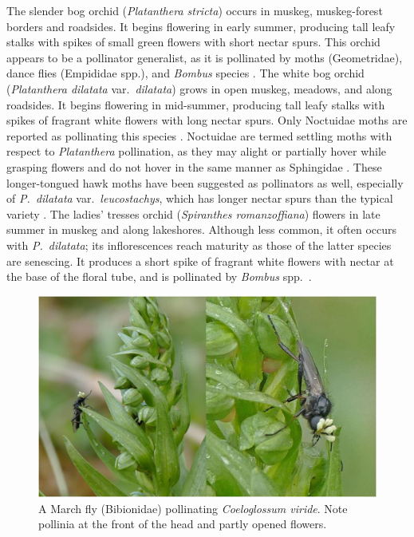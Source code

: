 \begin{multicols}{2}
The slender bog orchid (\emph{Platanthera stricta}) occurs in muskeg,
muskeg-forest borders and roadsides. It begins flowering in early
summer, producing tall leafy stalks with spikes of small green flowers
with short nectar spurs. This orchid appears to be a pollinator
generalist, as it is pollinated by moths (Geometridae), dance flies
(Empididae spp.), and \emph{Bombus} species \citep{Pattetal1989}.
The white bog orchid (\emph{Platanthera dilatata} var.\ \emph{dilatata})
grows in open muskeg, meadows, and along roadsides. It begins flowering
in mid-summer, producing tall leafy stalks with spikes of fragrant white
flowers with long nectar spurs. Only Noctuidae moths are reported as
pollinating this species \citep{Larson1992}. Noctuidae are termed settling
moths with respect to \emph{Platanthera} pollination, as they may alight
or partially hover while grasping flowers and do not hover in the same
manner as Sphingidae \citep{HapemanInoue1997}. These longer-tongued hawk
moths have been suggested as pollinators as well, especially of \emph{P.\
dilatata} var.\ \emph{leucostachys}, which has longer nectar spurs than the
typical variety \citep{Sheviak2002}. The ladies' tresses orchid
(\emph{Spiranthes romanzoffiana}) flowers in late summer in muskeg and
along lakeshores. Although less common, it often occurs with \emph{P.\
dilatata}; its inflorescences reach maturity as those of the latter
species are senescing. It produces a short spike of fragrant white
flowers with nectar at the base of the floral tube, and is pollinated by
\emph{Bombus} spp.\ \citep{LarsonLarson1987}.

\begin{figure}[H]
\begin{center}
\vspace{2mm}
\includegraphics[width=\textwidth]{img/Bibionidae.jpg}
\caption{A March fly (Bibionidae) pollinating \emph{Coeloglossum viride}.  Note pollinia at the front of the head and partly opened flowers.}
\label{Bibionidae}
\end{center}
\end{figure}




\end{multicols}
